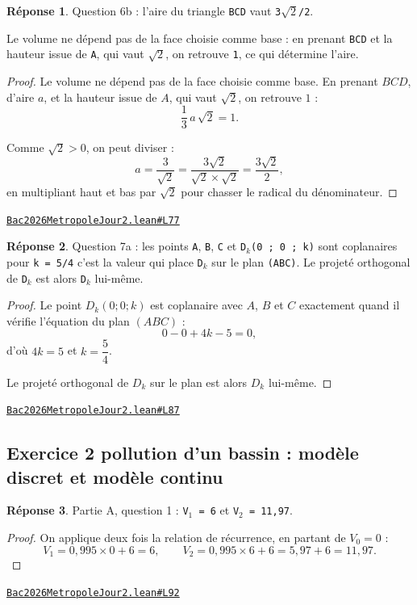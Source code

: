 \documentclass[11pt,a4paper]{article}
\theoremstyle{definition}
\theoremstyle{plain}
\theoremstyle{definition}
\newtheorem*{reponse}{Réponse}
\newcommand{\source}[2]{\par\smallskip\noindent\hfill{\footnotesize\href{#1}{\texttt{#2}}}\par\smallskip}
\begin{document}
\begin{reponse}
Question 6b : l'aire du triangle \texttt{BCD} vaut \texttt{3\(\sqrt{2}\)/2}.

Le volume ne dépend pas de la face choisie comme base : en prenant \texttt{BCD} et la hauteur
issue de \texttt{A}, qui vaut \texttt{\(\sqrt{2}\)}, on retrouve \texttt{1}, ce qui détermine l'aire.
\end{reponse}
\begin{proof}
Le volume ne dépend pas de la face choisie comme base. En prenant $BCD$, d'aire $a$, et la
hauteur issue de $A$, qui vaut $\sqrt{2}$, on retrouve $1$ :
\[ \frac{1}{3}\,a\,\sqrt{2} = 1 . \]

Comme $\sqrt{2} > 0$, on peut diviser :
\[ a = \frac{3}{\sqrt{2}} = \frac{3\sqrt{2}}{\sqrt{2} \times \sqrt{2}}
     = \frac{3\sqrt{2}}{2} , \]
en multipliant haut et bas par $\sqrt{2}$ pour chasser le radical du dénominateur.
\end{proof}
\source{https://github.com/Commutator-IO/learn-lean/blob/main/exams/2026/Bac2026MetropoleJour2.lean\#L77}{Bac2026MetropoleJour2.lean\#L77}

\begin{reponse}
Question 7a : les points \texttt{A}, \texttt{B}, \texttt{C} et \texttt{D\(_{k}\)(0 ; 0 ; k)} sont coplanaires pour
\texttt{k = 5/4} \textemdash{} c'est la valeur qui place \texttt{D\(_{k}\)} sur le plan \texttt{(ABC)}. Le projeté orthogonal
de \texttt{D\(_{k}\)} est alors \texttt{D\(_{k}\)} lui-même.
\end{reponse}
\begin{proof}
Le point $D_k(0 ; 0 ; k)$ est coplanaire avec $A$, $B$ et $C$ exactement quand il vérifie
l'équation du plan $(ABC)$ :
\[ 0 - 0 + 4k - 5 = 0 , \]
d'où $4k = 5$ et $k = \dfrac{5}{4}$.

Le projeté orthogonal de $D_k$ sur le plan est alors $D_k$ lui-même.
\end{proof}
\source{https://github.com/Commutator-IO/learn-lean/blob/main/exams/2026/Bac2026MetropoleJour2.lean\#L87}{Bac2026MetropoleJour2.lean\#L87}

\subsection{Exercice 2 \textemdash{} pollution d'un bassin : modèle discret et modèle continu}

\begin{reponse}
Partie A, question 1 : \texttt{V\(_{1}\) = 6} et \texttt{V\(_{2}\) = 11,97}.
\end{reponse}
\begin{proof}
On applique deux fois la relation de récurrence, en partant de $V_0 = 0$ :
\[ V_1 = 0{,}995 \times 0 + 6 = 6 , \qquad
   V_2 = 0{,}995 \times 6 + 6 = 5{,}97 + 6 = 11{,}97 . \]
\end{proof}
\source{https://github.com/Commutator-IO/learn-lean/blob/main/exams/2026/Bac2026MetropoleJour2.lean\#L92}{Bac2026MetropoleJour2.lean\#L92}
\end{document}
